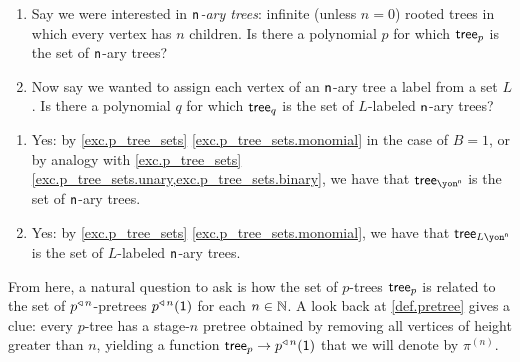 \documentclass[Book-Poly]{subfiles}
\begin{document}
\begin{exercise}
\begin{enumerate}
    \item Say we were interested in \emph{$\mathsf{n}$-ary trees}: infinite (unless $n=0$) rooted trees in which every vertex has $n$ children.
    Is there a polynomial $p$ for which $\mathsf{tree}_p$ is the set of $\mathsf{n}$-ary trees?
    \item Now say we wanted to assign each vertex of an $\mathsf{n}$-ary tree a label from a set $L$.
    Is there a polynomial $q$ for which $\mathsf{tree}_q$ is the set of $L$-labeled $\mathsf{n}$-ary trees?\qedhere
\end{enumerate}
\begin{solution}
\begin{enumerate}
    \item Yes: by \cref{exc.p_tree_sets} \cref{exc.p_tree_sets.monomial} in the case of $B=1$, or by analogy with \cref{exc.p_tree_sets} \cref{exc.p_tree_sets.unary,exc.p_tree_sets.binary}, we have that $\tr_{\yon^\ord{n}}$ is the set of $\mathsf{n}$-ary trees.
    \item Yes: by \cref{exc.p_tree_sets} \cref{exc.p_tree_sets.monomial}, we have that $\tr_{L\yon^\ord{n}}$ is the set of $L$-labeled $\mathsf{n}$-ary trees.
\end{enumerate}
\end{solution}
\end{exercise}

From here, a natural question to ask is how the set of $p$-trees $\mathsf{tree}_p$ is related to the set of $p^{\mathbin{\triangleleft}\,n}$-pretrees $p^{\mathbin{\triangleleft}\,n}(\textsf{1})$ for each $n\in\mathbb{N}$.
A look back at \cref{def.pretree} gives a clue: every $p$-tree has a stage-$n$ pretree obtained by removing all vertices of height greater than $n$, yielding a function $\mathsf{tree}_p\to p^{\mathbin{\triangleleft}\,n}(\textsf{1})$ that we will denote by $\pi^{(n)}$.
\end{document}
